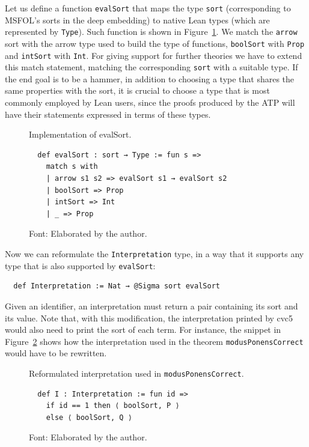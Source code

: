 Let us define a function \texttt{evalSort} that maps the type \texttt{sort}
(corresponding to MSFOL's sorts in the deep embedding) to native Lean types
(which are represented by \texttt{Type}). Such function is shown in Figure~\ref{impEvalSort}.
We match the \texttt{arrow} sort with the arrow type used to build the type of
functions, \texttt{boolSort} with \texttt{Prop} and \texttt{intSort} with \texttt{Int}.
For giving support for further theories we have to extend this match statement,
matching the corresponding \texttt{sort} with a suitable type.
If the end goal is to be a hammer, in addition to choosing a type that shares the
same properties with the sort, it is crucial to choose a type that is most commonly
employed by Lean users, since the proofs produced by the ATP will have their
statements expressed in terms of these types.

\begin{figure}[t]
\caption{Implementation of evalSort.}\label{impEvalSort}
\begin{verbatim}
  def evalSort : sort → Type := fun s =>
    match s with
    | arrow s1 s2 => evalSort s1 → evalSort s2
    | boolSort => Prop
    | intSort => Int
    | _ => Prop
\end{verbatim}
\caption*{Font: Elaborated by the author.}
\end{figure}

Now we can reformulate the \texttt{Interpretation} type, in a way that
it supports any type that is also supported by \texttt{evalSort}:

\begin{verbatim}
  def Interpretation := Nat → @Sigma sort evalSort
\end{verbatim}

Given an identifier, an interpretation must return a pair containing its sort
and its value. Note that, with this modification, the interpretation printed
by cvc5 would also need to print the sort of each term. For instance,
the snippet in Figure~\ref{fig:new_interp} shows how the interpretation
used in the theorem \texttt{modusPonensCorrect} would have to be rewritten.

\begin{figure}[t]
\caption{Reformulated interpretation used in \texttt{modusPonensCorrect}.}\label{fig:new_interp}
\begin{verbatim}
  def I : Interpretation := fun id =>
    if id == 1 then ⟨ boolSort, P ⟩
    else ⟨ boolSort, Q ⟩
\end{verbatim}
\caption*{Font: Elaborated by the author.}
\end{figure}

